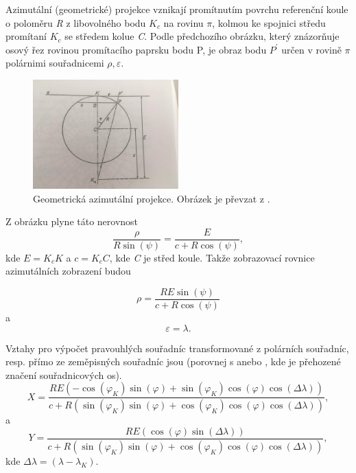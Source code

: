 Azimutální (geometrické) projekce vznikají promítnutím povrchu referenční koule o poloměru \textit{R} z libovolného bodu $K_{c}$ na rovinu $\pi$, kolmou ke spojnici středu promítaní $K_{c}$ se středem kolue \textit{C}. Podle předchozího obrázku, který znázorňuje osový řez rovinou promítacího paprsku bodu P, je obraz bodu $P^{'}$ určen v rovině $\pi$ polárnimi souřadnicemi $\rho, \varepsilon$.

\begin{figure}[ht!]
\begin{center}

\includegraphics[width=0.5\textwidth]{FIG/azimProj.jpg}
\caption{Geometrická azimutální projekce. Obrázek je převzat z \cite{Buchar2002}.}
\label{fig:azimProj}
\end{center}
\end{figure}

Z obrázku plyne táto nerovnost
\begin{equation}
\dfrac{\rho}{R\sin{\left(\psi\right)}} = \dfrac{E}{c+R\cos{\left(\psi\right)}},
\end{equation}
kde $E = K_{c}K$ a $c = K_{c}C$, kde \textit{C} je střed koule. Takže zobrazovací rovnice azimutálních zobrazení budou

\begin{equation}
\rho = \dfrac{RE\sin{\left(\psi\right)}}{c+R\cos{\left(\psi\right)}}
\end{equation}
a
\begin{equation}
\varepsilon = \lambda.
\end{equation}

Vztahy pro výpočet pravouhlých souřadníc transformované z polárních souřadníc, resp. přímo ze zeměpisných souřadníc jsou (porovnej s \cite{stereoWolf} anebo \cite{Thomas1977},  kde je přehozené značení souřadnicových os).
\begin{equation}
X = \dfrac{RE\left(-\cos{\left(\varphi_{K}\right)}\sin{\left(\varphi\right)}+\sin{\left(\varphi_{K}\right)}\cos{\left(\varphi\right)}\cos{\left(\Delta\lambda\right)}\right)}{c+R\left( \sin{\left(\varphi_{K}\right)}\sin{\left(\varphi\right)}+\cos{\left(\varphi_{K}\right)}\cos{\left(\varphi\right)}\cos{\left(\Delta\lambda\right)} \right)},
\end{equation}
a
\begin{equation}
Y = \dfrac{RE\left(\cos{\left(\varphi\right)}\sin{\left(\Delta\lambda\right)}\right)}{c+R\left( \sin{\left(\varphi_{K}\right)}\sin{\left(\varphi\right)}+\cos{\left(\varphi_{K}\right)}\cos{\left(\varphi\right)}\cos{\left(\Delta\lambda\right)} \right)},
\end{equation}
kde $\Delta\lambda = \left(\lambda - \lambda_{K}\right)$.

